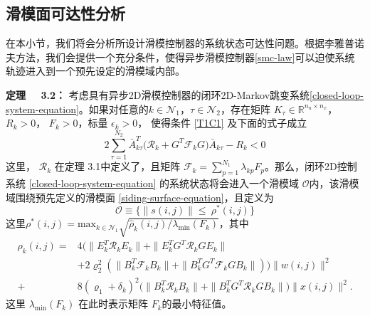 \subsection{滑模面可达性分析}\label{minimization} 
	在本小节，我们将会分析所设计滑模控制器的系统状态可达性问题。根据李雅普诺夫方法，我们会提供一个充分条件，使得异步滑模控制器\eqref{smc-law}可以迫使系统轨迹进入到一个预先设定的滑模域内部。
	
	{\bf 定理 \ \ 3.2：}
	考虑具有异步2D滑模控制器的闭环2D-Markov跳变系统\eqref{closed-loop-system-equation}。如果对任意的$k\in\mathcal{N}_{1}$，$\tau\in\mathcal{N}_{2}$，存在矩阵 $K_{\tau }\in\mathbb{R}^{n_u\times n_x}$， $R_{k}>0$， $F_{k}>0$，标量 $\epsilon_{k}>0$，  使得条件 \eqref{T1C1} 及下面的式子成立
	\begin{equation} \label{T2C1}
	2\sum_{\tau =1}^{N_{2}} \bar{A}^{T}_{k\tau }\big(\mathcal{R}_{k}+G^{T}\mathcal{F}_{k}G\big)\bar{A}_{k\tau }-R_{k} <0
	\end{equation}
	这里， $\mathcal{R}_{k}$ 在定理 3.1中定义了，且矩阵 $\mathcal{F}_{k}=\sum_{p=1}^{N_{1}}\lambda_{kp}F_{p}$。那么，闭环2D控制系统   \eqref{closed-loop-system-equation} 的系统状态将会进入一个滑模域 $\mathcal{O}$内，该滑模域围绕预先定义的滑模面 \eqref{siding-surface-equation}，且定义为
	\begin{equation}\label{smc-region}
	\mathcal{O}\equiv\Big\{\|s(i,j)\|\leq\ \rho^{*}(i,j) \Big\}
	\end{equation} 
	这里$\rho^{*}(i,j) = \mathrm{max}_{k\in\mathcal{N}_{1}}\sqrt{\hat{\rho}_{k}(i,j)/
		\lambda_{\mathrm{min}}(F_{k})}$，其中
	\begin{equation*}
	\begin{split}
	\hat{\rho}_{k}(i,j)=&4\big(\|E^{T}_{k}\mathcal{R}_{k}E_{k}\|+ \|E^{T}_{k}G^{T}\mathcal{R}_{k}GE_{k}\|\\
	&+2\varrho_{2}^{2}(\|B^{T}_{k}\mathcal{F}_{k}B_{k}\|+ \|B^{T}_{k}G^{T}\mathcal{F}_{k}GB_{k}\| )\big)\|w(i,j)\|^{2}\\
	+&8(\varrho_{1}+\delta_{k})^{2}\big(\|B^{T}_{k}\mathcal{R}_{k}B_{k}\|+\|B^{T}_{k}G^{T}\mathcal{R}_{k}GB_{k}\|\big)\|x(i,j)\|^{2}.
	\end{split}
	\end{equation*}
	这里 $\lambda_{\mathrm{min}}(F_{k})$ 在此时表示矩阵 $F_{k}$的最小特征值。
	
